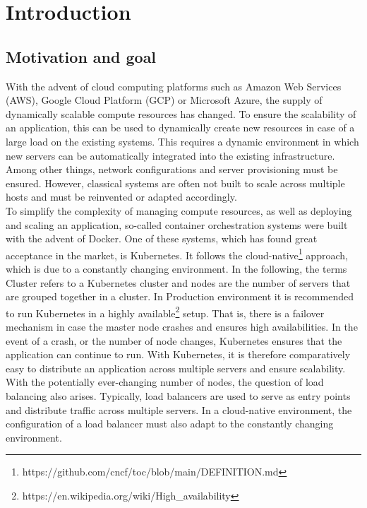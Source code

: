 \chapter{Introduction}


\section{Motivation and goal}
With the advent of cloud computing platforms such as Amazon Web Services (AWS), Google Cloud Platform (GCP) or Microsoft Azure, the supply of dynamically scalable compute resources has changed.
To ensure the scalability of an application, this can be used to dynamically create new resources in case of a large load on the existing systems.
This requires a dynamic environment in which new servers can be automatically integrated into the existing infrastructure.
Among other things, network configurations and server provisioning must be ensured.
However, classical systems are often not built to scale across multiple hosts and must be reinvented or adapted accordingly.
\\
To simplify the complexity of managing compute resources, as well as deploying and scaling an application, so-called container orchestration systems were built with the advent of Docker.
One of these systems, which has found great acceptance in the market, is Kubernetes.
It follows the cloud-native\footnote{https://github.com/cncf/toc/blob/main/DEFINITION.md} approach, which is due to a constantly changing environment.
In the following, the terms Cluster refers to a Kubernetes cluster and nodes are the number of servers that are grouped together in a cluster.
In Production environment it is recommended to run Kubernetes in a highly available\footnote{https://en.wikipedia.org/wiki/High\_availability} setup.
That is, there is a failover mechanism in case the master node crashes and ensures high availabilities.
In the event of a crash, or the number of node changes, Kubernetes ensures that the application can continue to run.
With Kubernetes, it is therefore comparatively easy to distribute an application across multiple servers and ensure scalability.
\\
With the potentially ever-changing number of nodes, the question of load balancing also arises.
Typically, load balancers are used to serve as entry points and distribute traffic across multiple servers.
In a cloud-native environment, the configuration of a load balancer must also adapt to the constantly changing environment.
